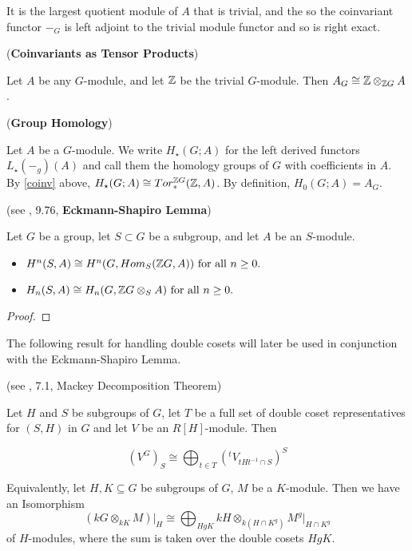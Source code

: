 It is the largest quotient module of $A$ that is trivial, and the so the coinvariant functor $-_G$ is left adjoint to the trivial module functor and so is right exact.

\begin{proposition} (\textbf{Coinvariants as Tensor Products\label{coinv}})

Let $A$ be any $G$-module, and let $\mathbb Z$ be the trivial $G$-module. Then $A_G \cong \mathbb Z \otimes_{\mathbb Z G} A$.
\end{proposition}

\begin{definition} (\textbf{Group Homology})

Let $A$ be a $G$-module. We write $H_\star (G;A)$ for the left derived functors $L_\star (-_g)(A)$ and call them the homology groups of $G$ with coefficients in $A$. By \ref{coinv} above, $H_\star (G;A) \cong Tor_*^{\mathbb Z G} (\mathbb Z, A)$. By definition, $H_0 (G;A) = A_G$.

\end{definition}

\begin{theorem} (see \cite{rotman}, 9.76, \textbf{Eckmann-Shapiro Lemma}\label{shapiro})

Let $G$ be a group, let $S \subset G$ be a subgroup, and let $A$ be an $S$-module.

\begin{itemize}
\item $H^n(S,A) \cong H^n (G, Hom_S(\mathbb Z G, A)) \text{ for all } n\geq 0.$

\item $H_n(S,A) \cong H_n (G, \mathbb Z G \otimes_S A) \text{ for all } n\geq 0.$
\end{itemize}
\begin{proof}

\end{proof}


\end{theorem}

The following result for handling double cosets will later be used in conjunction with the Eckmann-Shapiro Lemma.

\begin{theorem}(see \cite{karpilovsky}, 7.1, Mackey Decomposition Theorem\label{mackey})

Let $H$ and $S$ be subgroups of $G$, let $T$ be a full set of double coset representatives for $(S,H)$ in $G$ and let $V$ be an $R[H]$-module. Then

$$(V^G)_S \cong \bigoplus_{t\in T}(^t V_{tHt^{-1} \cap S})^S$$
\end{theorem}
Equivalently, let $H,K \subseteq G$ be subgroups of $G$, $M$ be a $K$-module. Then we have an Isomorphism
$$(kG \otimes_{kK} M) \vert_H \cong \bigoplus_{HgK} kH \otimes_{k(H \cap K^g)} M^g \vert_{H\cap K^g}$$
of $H$-modules, where the sum is taken over the double cosets $HgK$.

